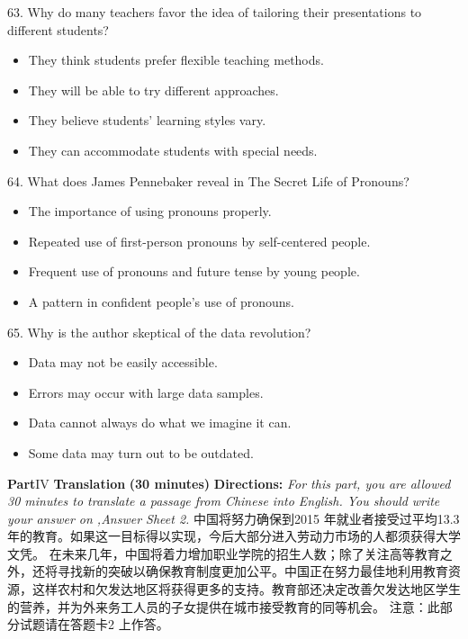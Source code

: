 \documentclass[UTF8,11pt]{ctexart}
\begin{document}
63. Why do many teachers favor the idea of tailoring their presentations to different students?


\begin{itemize}[leftmargin=2em,itemsep=.2em,topsep=.4em]\item[A.] They think students prefer flexible teaching methods.
\item[B.] They will be able to try different approaches.
\item[C.] They believe students' learning styles vary.
\item[D.] They can accommodate students with special needs.
\end{itemize}

64. What does James Pennebaker reveal in The Secret Life of Pronouns?


\begin{itemize}[leftmargin=2em,itemsep=.2em,topsep=.4em]\item[A.] The importance of using pronouns properly.
\item[B.] Repeated use of first-person pronouns by self-centered people.
\item[C.] Frequent use of pronouns and future tense by young people.
\item[D.] A pattern in confident people's use of pronouns.
\end{itemize}

65. Why is the author skeptical of the data revolution?


\begin{itemize}[leftmargin=2em,itemsep=.2em,topsep=.4em]\item[A.] Data may not be easily accessible.
\item[B.] Errors may occur with large data samples.
\item[C.] Data cannot always do what we imagine it can.
\item[D.] Some data may turn out to be outdated.
\end{itemize}

\textbf{Part}IV \textbf{Translation} \textbf{(30 minutes)} \textbf{Directions:}\textit{ For this part, you are allowed 30 minutes to translate a passage from Chinese into English. You should} \textit{write your answer on ,Answer Sheet 2.} 中国将努力确保到2015 年就业者接受过平均13.3 年的教育。如果这一目标得以实现，今后大部分进入劳动力市场的人都须获得大学文凭。 在未来几年，中国将着力增加职业学院的招生人数；除了关注高等教育之外，还将寻找新的突破以确保教育制度更加公平。中国正在努力最佳地利用教育资源，这样农村和欠发达地区将获得更多的支持。教育部还决定改善欠发达地区学生的营养，并为外来务工人员的子女提供在城市接受教育的同等机会。 注意：此部分试题请在答题卡2 上作答。
\end{document}
